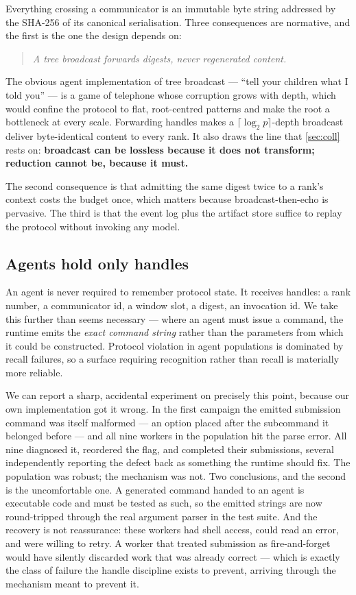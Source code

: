 \documentclass[10pt,twocolumn]{article}
\theoremstyle{definition}
\theoremstyle{plain}
\begin{document}
Everything crossing a communicator is an immutable byte string addressed by the
SHA-256 of its canonical serialisation. Three consequences are normative, and the
first is the one the design depends on:

\begin{quote}
\emph{A tree broadcast forwards digests, never regenerated content.}
\end{quote}

The obvious agent implementation of tree broadcast --- ``tell your children what I
told you'' --- is a game of telephone whose corruption grows with depth, which
would confine the protocol to flat, root-centred patterns and make the root a
bottleneck at every scale. Forwarding handles makes a
$\lceil\log_2 p\rceil$-depth broadcast deliver byte-identical content to every
rank. It also draws the line that \cref{sec:coll} rests on: \textbf{broadcast can
be lossless because it does not transform; reduction cannot be, because it must.}

The second consequence is that admitting the same digest twice to a rank's context
costs the budget once, which matters because broadcast-then-echo is pervasive. The
third is that the event log plus the artifact store suffice to replay the protocol
without invoking any model.

\subsection{Agents hold only handles}

An agent is never required to remember protocol state. It receives handles: a rank
number, a communicator id, a window slot, a digest, an invocation id. We take this
further than seems necessary --- where an agent must issue a command, the runtime
emits the \emph{exact command string} rather than the parameters from which it could
be constructed. Protocol violation in agent populations is dominated by recall
failures, so a surface requiring recognition rather than recall is materially more
reliable.

We can report a sharp, accidental experiment on precisely this point, because our
own implementation got it wrong. In the first campaign the emitted submission
command was itself malformed --- an option placed after the subcommand it belonged
before --- and all nine workers in the population hit the parse error. All nine
diagnosed it, reordered the flag, and completed their submissions, several
independently reporting the defect back as something the runtime should fix. The
population was robust; the mechanism was not. Two conclusions, and the second is the
uncomfortable one. A generated command handed to an agent is executable code and
must be tested as such, so the emitted strings are now round-tripped through the
real argument parser in the test suite. And the recovery is not reassurance: these
workers had shell access, could read an error, and were willing to retry. A worker
that treated submission as fire-and-forget would have silently discarded work that
was already correct --- which is exactly the class of failure the handle discipline
exists to prevent, arriving through the mechanism meant to prevent it.
\end{document}
